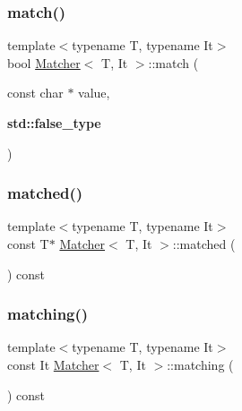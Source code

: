 \mbox{\label{class_matcher_a0abb0a8d3e921a4fe96fdd8646e7afd7}} 
\subsubsection{\texorpdfstring{match()}{match()}\hspace{0.1cm}{\footnotesize\ttfamily [6/6]}}
{\footnotesize\ttfamily template$<$typename T, typename It$>$ \\
bool \hyperlink{class_matcher}{Matcher}$<$ T, It $>$\+::match (\begin{DoxyParamCaption}\item[{const char $\ast$}]{value,  }\item[{\textbf{ std\+::false\+\_\+type}}]{ }\end{DoxyParamCaption})\hspace{0.3cm}{\ttfamily [inline]}}

\mbox{\label{class_matcher_a6a43511495d338b4572dcb52e96fc3a3}} 
\subsubsection{\texorpdfstring{matched()}{matched()}}
{\footnotesize\ttfamily template$<$typename T, typename It$>$ \\
const T$\ast$ \hyperlink{class_matcher}{Matcher}$<$ T, It $>$\+::matched (\begin{DoxyParamCaption}{ }\end{DoxyParamCaption}) const\hspace{0.3cm}{\ttfamily [inline]}}

\mbox{\label{class_matcher_abf9d0a1f24372dc9dde031ae6df26921}} 
\subsubsection{\texorpdfstring{matching()}{matching()}}
{\footnotesize\ttfamily template$<$typename T, typename It$>$ \\
const It \hyperlink{class_matcher}{Matcher}$<$ T, It $>$\+::matching (\begin{DoxyParamCaption}{ }\end{DoxyParamCaption}) const\hspace{0.3cm}{\ttfamily [inline]}}

